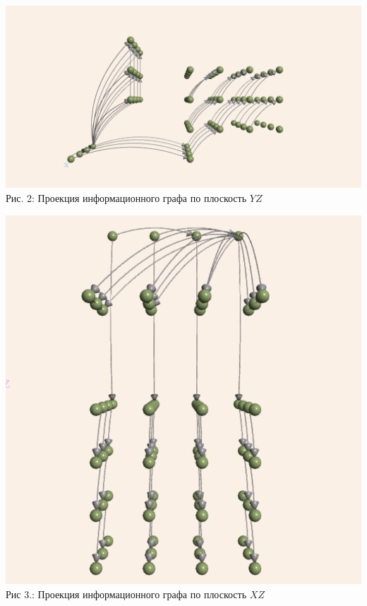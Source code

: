     \begin{center}
        \includegraphics[width=0.9\linewidth]{graph_yz.png}
        \newline
        Рис. 2: Проекция информационного графа по плоскость $YZ$
    \end{center}

    \begin{center}
        \includegraphics[width=0.9\linewidth]{graph_xz.png}
        \newline
        Рис 3.: Проекция информационного графа по плоскость $XZ$
    \end{center}

